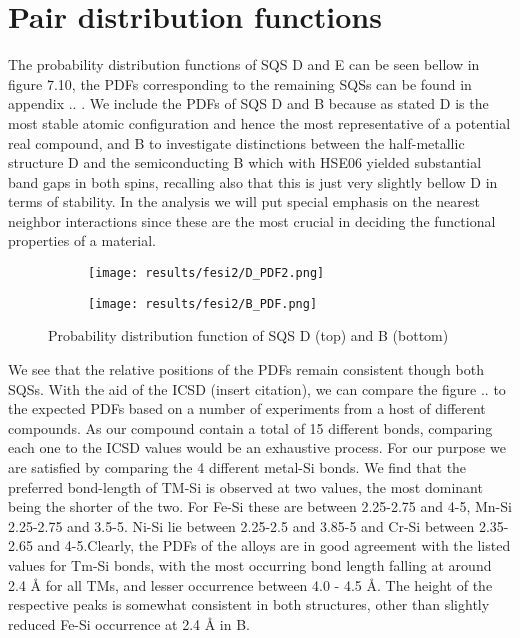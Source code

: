 \newpage
\section{Pair distribution functions}
The probability distribution functions of SQS D and E can be seen bellow in figure 7.10, the PDFs corresponding to the remaining SQSs can be found in appendix .. . We include the PDFs of SQS D and B because as stated D is the most stable atomic configuration and hence the most representative of a potential real compound, and B to investigate distinctions between the half-metallic structure D and the semiconducting B which with HSE06 yielded substantial band gaps in both spins, recalling also that this is just very slightly bellow D in terms of stability. In the analysis we will put special emphasis on the nearest neighbor interactions since these are the most crucial in deciding the functional properties of a material. 
 
\begin{figure}[H]
	\centering
	\begin{subfigure}{\textwidth}
		\texttt{[image: results/fesi2/D\_PDF2.png]}
	\end{subfigure}
	\begin{subfigure}{\textwidth}
		\texttt{[image: results/fesi2/B\_PDF.png]}
	\end{subfigure}
	\caption{Probability distribution function of SQS D (top) and B (bottom)}
\end{figure}

We see that the relative positions of the PDFs remain consistent though both SQSs. With the aid of the ICSD (insert citation), we can compare the figure .. to the expected PDFs based on a number of experiments from a host of different compounds. As our compound contain a total of 15 different bonds, comparing each one to the ICSD values would be an exhaustive process. For our purpose we are satisfied by comparing the 4 different metal-Si bonds. We find that the preferred bond-length of TM-Si is observed at two values, the most dominant being the shorter of the two. For Fe-Si these are between 2.25-2.75 and 4-5, Mn-Si 2.25-2.75 and 3.5-5. Ni-Si lie between 2.25-2.5 and 3.85-5 and Cr-Si between 2.35-2.65 and 4-5.Clearly, the PDFs of the alloys are in good agreement with the listed values for Tm-Si bonds, with the most occurring bond length falling at around 2.4 Å for all TMs, and lesser occurrence between 4.0 - 4.5 Å. The height of the respective peaks is somewhat consistent in both structures, other than slightly reduced Fe-Si occurrence at 2.4 Å in B.

